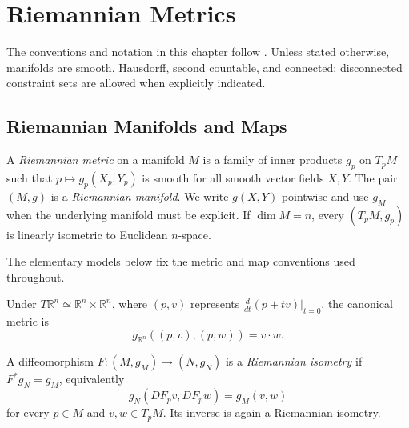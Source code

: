 \chapter{Riemannian Metrics}
\label{chap:pet-riemannian-metrics}

The conventions and notation in this chapter follow \cite{petersen2016}. Unless
stated otherwise, manifolds are smooth, Hausdorff, second countable, and
connected; disconnected constraint sets are allowed when explicitly indicated.

\section{Riemannian Manifolds and Maps}

\begin{definition}
  \label{def:pet-ch1-riemannian-manifold}
  \leanok
  A \emph{Riemannian metric} on a manifold $M$ is a family of inner products
  $g_p$ on $T_pM$ such that $p\mapsto g_p(X_p,Y_p)$ is smooth for all smooth
  vector fields $X,Y$. The pair $(M,g)$ is a \emph{Riemannian manifold}. We
  write $g(X,Y)$ pointwise and use $g_M$ when the underlying manifold must be
  explicit. If $\dim M=n$, every $(T_pM,g_p)$ is linearly isometric to
  Euclidean $n$-space.
\end{definition}

The elementary models below fix the metric and map conventions used throughout.

\begin{example}
  \label{ex:pet-ch1-euclidean-space}
  \leanok
  Under $T\mathbb{R}^n\simeq\mathbb{R}^n\times\mathbb{R}^n$, where
  $(p,v)$ represents $\frac{d}{dt}(p+tv)|_{t=0}$, the canonical metric is
  \[
    g_{\mathbb{R}^n}((p,v),(p,w))=v\cdot w.
  \]
\end{example}

\begin{definition}
  \label{def:pet-ch1-riemannian-isometry}
  \leanok
  A diffeomorphism $F:(M,g_M)\to(N,g_N)$ is a \emph{Riemannian isometry} if
  $F^*g_N=g_M$, equivalently
  \[
    g_N(DF_pv,DF_pw)=g_M(v,w)
  \]
  for every $p\in M$ and $v,w\in T_pM$. Its inverse is again a Riemannian
  isometry.
\end{definition}

